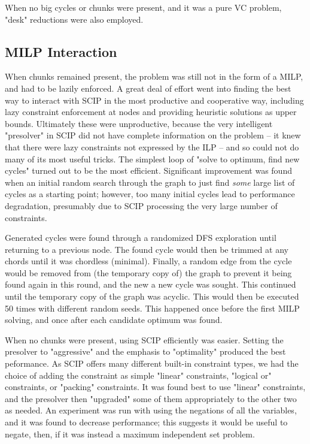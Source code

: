 \documentclass[a4paper,11pt]{article}
\newcommand{\9}{\,\,\,\,\,\,\,\,\,}
\begin{document}
\par When no big cycles or chunks were present, and it was a pure VC problem, "desk" reductions were also employed.

\subsection{MILP Interaction}
When chunks remained present, the problem was still not in the form of a MILP, and had to be lazily enforced. A great deal of effort went into finding the best way to interact with SCIP in the most productive and cooperative way, including lazy constraint enforcement at nodes and providing heuristic solutions as upper bounds. Ultimately these were unproductive, because the very intelligent "presolver" in SCIP did not have complete information on the problem -- it knew that there were lazy constraints not expressed by the ILP -- and so could not do many of its most useful tricks. The simplest loop of "solve to optimum, find new cycles" turned out to be the most efficient. Significant improvement was found when an initial random search through the graph to just find {\em some} large list of cycles as a starting point; however, too many initial cycles lead to performance degradation, presumably due to SCIP processing the very large number of constraints.

\par Generated cycles were found through a randomized DFS exploration until returning to a previous node. The found cycle would then be trimmed at any chords until it was chordless (minimal). Finally, a random edge from the cycle would be removed from (the temporary copy of) the graph to prevent it being found again in this round, and the new a new cycle was sought. This continued until the temporary copy of the graph was acyclic. This would then be executed 50 times with different random seeds. This happened once before the first MILP solving, and once after each candidate optimum was found.

\par When no chunks were present, using SCIP efficiently was easier. Setting the presolver to "aggressive" and the emphasis to "optimality" produced the best peformance. As SCIP offers many different built-in constraint types, we had the choice of adding the constraint as simple "linear" constraints, "logical or" constraints, or "packing" constraints. It was found best to use "linear" constraints, and the presolver then "upgraded" some of them appropriately to the other two as needed. An experiment was run with using the negations of all the variables, and it was found to decrease performance; this suggests it would be useful to negate, then, if it was instead a maximum independent set problem.
\end{document}
